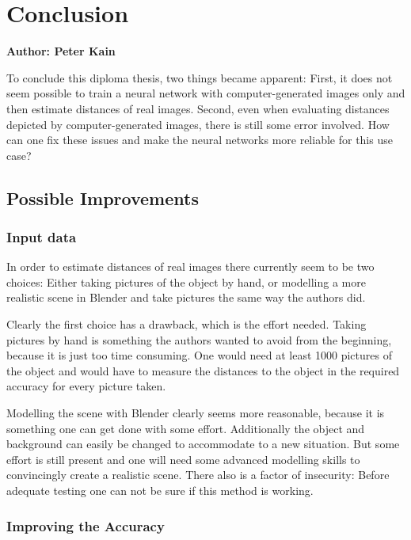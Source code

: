 \chapter{Conclusion}

\textbf{Author: Peter Kain} 

To conclude this diploma thesis, two things became apparent: First, it does not seem possible to train a neural network with computer-generated images only and then estimate distances of real images. Second, even when evaluating distances depicted by computer-generated images, there is still some error involved. How can one fix these issues and make the neural networks more reliable for this use case?

\section{Possible Improvements}

\subsection{Input data}

In order to estimate distances of real images there currently seem to be two choices: Either taking pictures of the object by hand, or modelling a more realistic scene in Blender and take pictures the same way the authors did.

Clearly the first choice has a drawback, which is the effort needed. Taking pictures by hand is something the authors wanted to avoid from the beginning, because it is just too time consuming. One would need at least 1000 pictures of the object and would have to measure the distances to the object in the required accuracy for every picture taken.

Modelling the scene with Blender clearly seems more reasonable, because it is something one can get done with some effort. Additionally the object and background can easily be changed to accommodate to a new situation. But some effort is still present and one will need some advanced modelling skills to convincingly create a realistic scene. There also is a factor of insecurity: Before adequate testing one can not be sure if this method is working.

\subsection{Improving the Accuracy}

